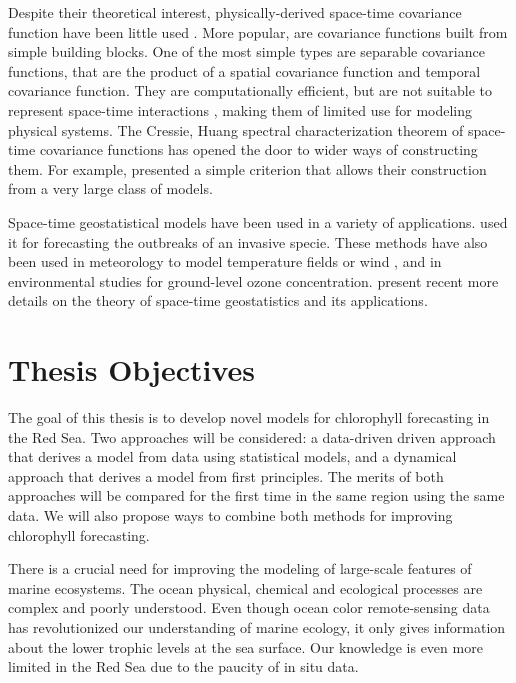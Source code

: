 Despite their theoretical interest, physically-derived space-time covariance 
function have been little used \citep{Gneiting2010}. More popular, are 
covariance functions built from simple building blocks. One of the most simple 
types are separable covariance functions, that are the product of a spatial 
covariance function and temporal covariance function. They are computationally 
efficient, but are not suitable to represent space-time interactions 
\citep{Cressie1999, Stein2005}, making them of limited use for modeling physical 
systems. The Cressie, Huang spectral characterization theorem of space-time 
covariance functions has opened the door to wider ways of constructing them. For 
example, \citet{Gneiting2002} presented a simple criterion that allows their 
construction from a very large class of models. 

Space-time geostatistical models have been used in a variety of applications. 
\citet{Hohn1993} used it for forecasting the outbreaks of an invasive specie. 
These methods have also been used in meteorology to model temperature fields 
\citep{Handcock1994, North2011} or wind \citep{Cressie1999, Gneiting2002}, and 
in environmental studies for ground-level ozone concentration. 
\citet{Gneiting2007, Gneiting2010} present recent more details on the theory of 
space-time geostatistics and its applications.

\section{Thesis Objectives}

The goal of this thesis is to develop novel models for chlorophyll forecasting
in the Red Sea. Two approaches will be considered: a data-driven driven
approach that derives a model from data using statistical models, and a
dynamical approach that derives a model from first principles. The merits of both
approaches will be compared for the first time in the same region using the same
data. We will also propose ways to combine both methods for improving chlorophyll
forecasting.

There is a crucial need for improving the modeling of large-scale features
of marine ecosystems. The ocean physical, chemical and ecological processes are
complex and poorly understood. Even though ocean color remote-sensing data has
revolutionized our understanding of marine ecology, it only gives information
about the lower trophic levels at the sea surface. Our knowledge is even more
limited in the Red Sea due to the paucity of in situ data.

